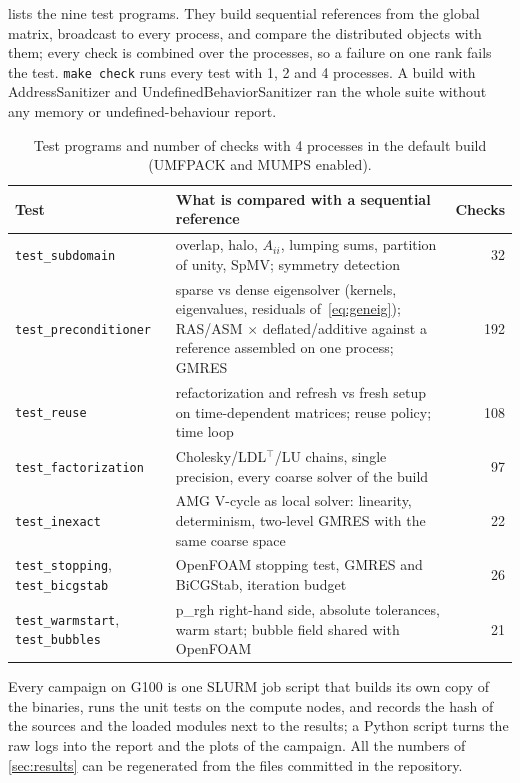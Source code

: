 \documentclass[11pt,a4paper]{article}
\begin{document}
 lists the nine test programs. They build sequential references from the global matrix,
broadcast to every process, and compare the distributed objects with them; every check is combined over the
processes, so a failure on one rank fails the test. \texttt{make check} runs every test with 1, 2 and 4
processes. A build with AddressSanitizer and UndefinedBehaviorSanitizer ran the whole suite without any
memory or undefined-behaviour report.

\begin{table}[t]
\centering\small
\caption{Test programs and number of checks with 4 processes in the default build (UMFPACK and MUMPS
enabled).}\label{tab:tests}
\begin{tabularx}{\textwidth}{@{}l X r@{}}
\toprule
Test & What is compared with a sequential reference & Checks\\
\midrule
\texttt{test\_subdomain} & overlap, halo, $A_{ii}$, lumping sums, partition of unity, SpMV; symmetry detection & 32\\
\texttt{test\_preconditioner} & sparse vs dense eigensolver (kernels, eigenvalues, residuals of~\eqref{eq:geneig}); RAS/ASM $\times$ deflated/additive against a reference assembled on one process; GMRES & 192\\
\texttt{test\_reuse} & refactorization and refresh vs fresh setup on time-dependent matrices; reuse policy; time loop & 108\\
\texttt{test\_factorization} & Cholesky/LDL$^\top$/LU chains, single precision, every coarse solver of the build & 97\\
\texttt{test\_inexact} & AMG V-cycle as local solver: linearity, determinism, two-level GMRES with the same coarse space & 22\\
\texttt{test\_stopping}, \texttt{test\_bicgstab} & OpenFOAM stopping test, GMRES and BiCGStab, iteration budget & 26\\
\texttt{test\_warmstart}, \texttt{test\_bubbles} & p\_rgh right-hand side, absolute tolerances, warm start; bubble field shared with OpenFOAM & 21\\
\bottomrule
\end{tabularx}
\end{table}

Every campaign on G100 is one SLURM job script that builds its own copy of the binaries, runs the unit tests
on the compute nodes, and records the hash of the sources and the loaded modules next to the results; a
Python script turns the raw logs into the report and the plots of the campaign. All the numbers of
\cref{sec:results} can be regenerated from the files committed in the repository.
\end{document}
